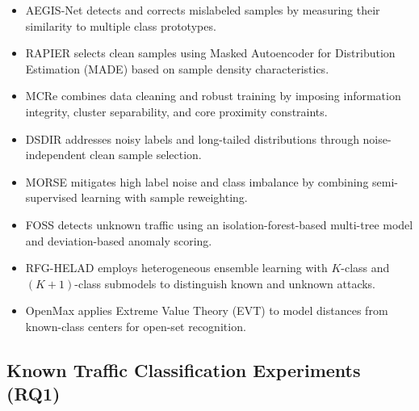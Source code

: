 \documentclass{SCIS2026}
\begin{document}
\begin{itemize}
	\item AEGIS-Net \cite{AEGIS-Net} detects and corrects mislabeled samples by measuring their similarity to multiple class prototypes.
	
	\item RAPIER \cite{RAPIER} selects clean samples using Masked Autoencoder for Distribution Estimation (MADE) based on sample density characteristics.
	
	\item MCRe \cite{MCRe} combines data cleaning and robust training by imposing information integrity, cluster separability, and core proximity constraints.
	
	\item DSDIR \cite{DSDIR} addresses noisy labels and long-tailed distributions through noise-independent clean sample selection.
	
	\item MORSE \cite{MORSE} mitigates high label noise and class imbalance by combining semi-supervised learning with sample reweighting.
	
	\item FOSS \cite{FOSS} detects unknown traffic using an isolation-forest-based multi-tree model and deviation-based anomaly scoring.
	
	\item RFG-HELAD \cite{RFG-HELAD} employs heterogeneous ensemble learning with $K$-class and $(K+1)$-class submodels to distinguish known and unknown attacks.
	
	\item OpenMax \cite{OpenMax} applies Extreme Value Theory (EVT) to model distances from known-class centers for open-set recognition.
\end{itemize}

\subsection{Known Traffic Classification Experiments (RQ1)}
\end{document}
